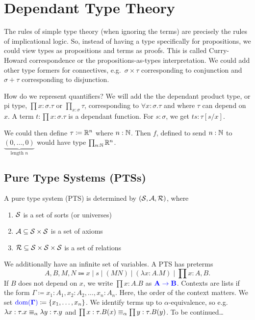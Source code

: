 \section{Dependant Type Theory}


The rules of simple type theory (when ignoring the terms) are precisely the rules of implicational logic. 
So, instead of having a type specifically for propositions, we could view types as propositions and terms as proofs. 
This is called \alert{Curry-Howard correspondence} or the \alert{propositions-as-types interpretation}.
We could add other type formers for connectives, e.g.\ $\sigma \times \tau$ corresponding to conjunction and $\sigma + \tau$ corresponding to disjunction.

How do we represent quantifiers?
We will add the the \alert{dependant product type}, or \alert{pi type}, $\prod x : \sigma. \tau$ or $\prod_{x : \sigma} \tau$, corresponding to $\forall x : \sigma. \tau$ and where $\tau$ can depend on $x$.
A term $t : \prod x : \sigma. \tau$ is a dependant function. 
For $s : \sigma$, we get $ts : \tau[s/x]$.

\begin{example}
    We could then define $\tau \coloneq \mathbb{R}^n$ where $n : \mathbb{N}$. 
    Then $f$, defined to send $n : \mathbb{N}$ to $\underbrace{(0, \dots, 0)}_{\text{length }n}$ would have type $\prod_{n : \mathbb{N}} \mathbb{R}^n$.
\end{example}

\subsection{Pure Type Systems (PTSs)}

\begin{boxdefi}
    A \alert{pure type system (PTS)} is determined by $(\mathcal{S}, \mathcal{A}, \mathcal{R})$, where 
    \begin{enumerate}
        \item $\mathcal{S}$ is a set of \alert{sorts} (or \alert{universes})
        \item $\mathcal{A} \subseteq \mathcal{S} \times \mathcal{S}$ is a set of \alert{axioms}
        \item $\mathcal{R} \subseteq \mathcal{S} \times \mathcal{S} \times \mathcal{S}$ is a set of \alert{relations}
    \end{enumerate}
    We additionally have an infinite set of variables. 
    A PTS has \alert{preterms} 
    \begin{equation*}
        A, B, M, N \Coloneqq x  \mid s \mid (MN) \mid (\lambda x : A. M) \mid \prod x : A, B.
    \end{equation*}
    If $B$ does not depend on $x$, we write $\prod x : A. B$ as $\alert{A \to B}$.
    \alert{Contexts} are lists if the form $\Gamma \coloneq x_1 : A_1, x_2 : A_2, \dots, x_n : A_n$.
    Here, the order of the context matters. 
    We set $\alert{\domain{\Gamma}} \coloneq \{x_1, \dots, x_n\}$. 
    We identify terms up to $\alpha$-equivalence, so e.g.\ $\lambda x : \tau. x \equiv_{\alpha} \lambda y : \tau. y$ and $\prod x : \tau. B(x) \equiv_{\alpha} \prod y : \tau. B(y)$.
    To be continued\dots 
\end{boxdefi}